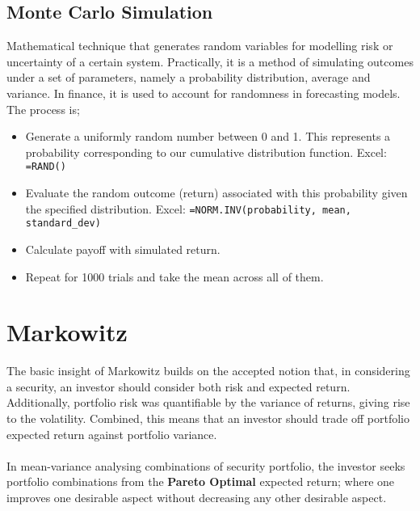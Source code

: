 \documentclass[a4paper]{article}
\begin{document}
\subsection{Monte Carlo Simulation}
Mathematical technique that generates random variables for modelling risk
or uncertainty of a certain system. Practically, it is a method of simulating
outcomes under a set of parameters, namely a probability distribution,
average and variance. In finance, it is used to account for randomness
in forecasting models. The process is;
\begin{itemize}
\item Generate a uniformly random number between 0 and 1. This represents
a probability corresponding to our cumulative distribution function. Excel:
\texttt{=RAND()}
\item Evaluate the random outcome (return) associated with this
probability given the specified distribution. Excel:
\texttt{=NORM.INV(probability, mean, standard\_dev)}
\item Calculate payoff with simulated return.
\item Repeat for 1000 trials and take the mean across all of them.
\end{itemize}
\section{Markowitz}
The basic insight of Markowitz builds on the accepted notion that, in
considering a security, an investor should consider both risk and
expected return. Additionally, portfolio risk was quantifiable by the
variance of returns, giving rise to the volatility. Combined, this means
that an investor should trade off portfolio expected return against
portfolio variance. \\\\
%
%
In mean-variance analysing combinations of security portfolio, the investor
seeks portfolio combinations from the \textbf{Pareto Optimal} expected return;
where one improves one desirable aspect without decreasing any other
desirable aspect.
\end{document}
